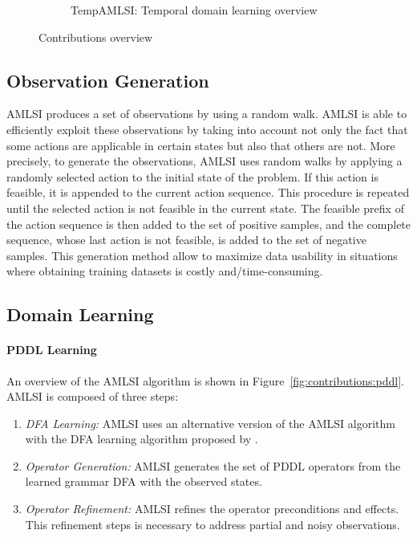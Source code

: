 \begin{figure}
\begin{subfigure}[b]{0.2\linewidth}
        \caption{TempAMLSI: {\sf Temporal} domain learning overview}
        \label{fig:contributions:temporal}
    \end{subfigure}
    \caption{Contributions overview}
    \label{fig:contributions}
\end{figure}

\subsection{Observation Generation}

AMLSI produces a set of observations by using a random walk. AMLSI is able to efficiently exploit these observations by taking into account not only the fact that some actions are applicable in certain states but also that others are not. More precisely, to generate the observations, AMLSI uses random walks by applying a randomly selected action to the initial state of the problem. If this action is feasible, it is appended to the current action sequence. This procedure is repeated until the selected action is not feasible in the current state. The feasible prefix of the action sequence is then added to the set of positive samples, and the complete sequence, whose last action is not feasible, is added to the set of negative samples. This generation method allow to maximize data usability in situations where obtaining training datasets is costly and/time-consuming.

\subsection{Domain Learning}

\paragraph{PDDL Learning}
An overview of the AMLSI \cite{amlsi_ictai, amlsi_keps} algorithm is shown in Figure~\ref{fig:contributions:pddl}. AMLSI is composed of three steps:
\begin{enumerate}
    \item {\em DFA Learning:} AMLSI uses an alternative version of the AMLSI algorithm with the DFA learning algorithm proposed by \cite{amlsi_ictai}.
    \item {\em Operator Generation:} AMLSI generates the set of PDDL operators from the learned grammar DFA with the observed states.
    \item {\em Operator Refinement:} AMLSI refines the operator preconditions and effects. This refinement steps is necessary to address partial and noisy observations.
\end{enumerate}

